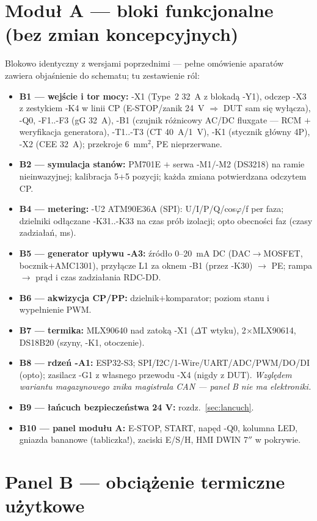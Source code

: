 \documentclass[11pt,a4paper]{article}
\begin{document}
\section{Moduł A --- bloki funkcjonalne (bez zmian koncepcyjnych)}
Blokowo identyczny z wersjami poprzednimi --- pełne omówienie aparatów zawiera objaśnienie do
schematu; tu zestawienie ról:
\begin{itemize}
\item \textbf{B1 --- wejście i tor mocy:} -X1 (Type~2 32~A z blokadą -Y1), odczep -X3 z zestykiem
-K4 w linii CP (E-STOP/zanik 24~V $\Rightarrow$ DUT sam się wyłącza), -Q0, -F1..-F3 (gG 32~A),
-B1 (czujnik różnicowy AC/DC fluxgate --- RCM $+$ weryfikacja generatora), -T1..-T3 (CT 40~A/1~V),
-K1 (stycznik główny 4P), -X2 (CEE 32~A); przekroje 6~mm$^2$, PE nieprzerwane.
\item \textbf{B2 --- symulacja stanów:} PM701E $+$ serwa -M1/-M2 (DS3218) na ramie nieinwazyjnej;
kalibracja 5$+$5 pozycji; każda zmiana potwierdzana odczytem CP.
\item \textbf{B4 --- metering:} -U2 ATM90E36A (SPI): U/I/P/Q/cos$\varphi$/f per faza; dzielniki
odłączane -K31..-K33 na czas prób izolacji; opto obecności faz (czasy zadziałań, ms).
\item \textbf{B5 --- generator upływu -A3:} źródło 0--20~mA DC (DAC$\to$MOSFET, bocznik$+$AMC1301),
przyłącze L1 za oknem -B1 (przez -K30) $\to$ PE; rampa $\to$ prąd i czas zadziałania RDC-DD.
\item \textbf{B6 --- akwizycja CP/PP:} dzielnik$+$komparator; poziom stanu i wypełnienie PWM.
\item \textbf{B7 --- termika:} MLX90640 nad zatoką -X1 ($\Delta$T wtyku), 2$\times$MLX90614,
DS18B20 (szyny, -K1, otoczenie).
\item \textbf{B8 --- rdzeń -A1:} ESP32-S3; SPI/I2C/1-Wire/UART/ADC/PWM/DO/DI (opto); zasilacz -G1
z własnego przewodu -X4 (nigdy z DUT). \emph{Względem wariantu magazynowego znika magistrala CAN
--- panel B nie ma elektroniki.}
\item \textbf{B9 --- łańcuch bezpieczeństwa 24 V:} rozdz.~\ref{sec:lancuch}.
\item \textbf{B10 --- panel modułu A:} E-STOP, START, napęd -Q0, kolumna LED, gniazda bananowe
(tabliczka!), zaciski E/S/H, HMI DWIN 7$''$ w pokrywie.
\end{itemize}

\section{Panel B --- obciążenie termiczne użytkowe}
\end{document}
